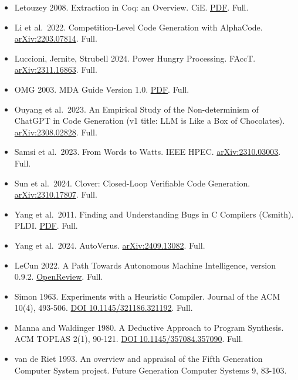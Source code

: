 \documentclass[10pt,letterpaper]{article}
\begin{document}
\begin{itemize}
  Leroy 2009. Formal verification of a realistic compiler. CACM.
  \href{https://xavierleroy.org/publi/compcert-CACM.pdf}{PDF}. Full.
\item
  Letouzey 2008. Extraction in Coq: an Overview. CiE.
  \href{https://www.irif.fr/~letouzey/download/letouzey_extr_cie08.pdf}{PDF}.
  Full.
\item
  Li et al.~2022. Competition-Level Code Generation with AlphaCode.
  \href{https://arxiv.org/abs/2203.07814}{arXiv:2203.07814}. Full.
\item
  Luccioni, Jernite, Strubell 2024. Power Hungry Processing. FAccT.
  \href{https://arxiv.org/abs/2311.16863}{arXiv:2311.16863}. Full.
\item
  OMG 2003. MDA Guide Version 1.0.
  \href{https://www.omg.org/mda/mda_files/MDA_Guide_Version1-0.pdf}{PDF}.
  Full.
\item
  Ouyang et al.~2023. An Empirical Study of the Non-determinism of
  ChatGPT in Code Generation (v1 title: LLM is Like a Box of
  Chocolates).
  \href{https://arxiv.org/abs/2308.02828}{arXiv:2308.02828}. Full.
\item
  Samsi et al.~2023. From Words to Watts. IEEE HPEC.
  \href{https://arxiv.org/abs/2310.03003}{arXiv:2310.03003}. Full.
\item
  Sun et al.~2024. Clover: Closed-Loop Verifiable Code Generation.
  \href{https://arxiv.org/abs/2310.17807}{arXiv:2310.17807}. Full.
\item
  Yang et al.~2011. Finding and Understanding Bugs in C Compilers
  (Csmith). PLDI.
  \href{https://users.cs.utah.edu/~regehr/papers/pldi11-preprint.pdf}{PDF}.
  Full.
\item
  Yang et al.~2024. AutoVerus.
  \href{https://arxiv.org/abs/2409.13082}{arXiv:2409.13082}. Full.
\item
  LeCun 2022. A Path Towards Autonomous Machine Intelligence, version
  0.9.2. \href{https://openreview.net/forum?id=BZ5a1r-kVsf}{OpenReview}.
  Full.
\item
  Simon 1963. Experiments with a Heuristic Compiler. Journal of the ACM
  10(4), 493-506. \href{https://doi.org/10.1145/321186.321192}{DOI
  10.1145/321186.321192}. Full.
\item
  Manna and Waldinger 1980. A Deductive Approach to Program Synthesis.
  ACM TOPLAS 2(1), 90-121.
  \href{https://doi.org/10.1145/357084.357090}{DOI
  10.1145/357084.357090}. Full.
\item
  van de Riet 1993. An overview and appraisal of the Fifth Generation
  Computer System project. Future Generation Computer Systems 9, 83-103.

\end{itemize}
\end{document}
